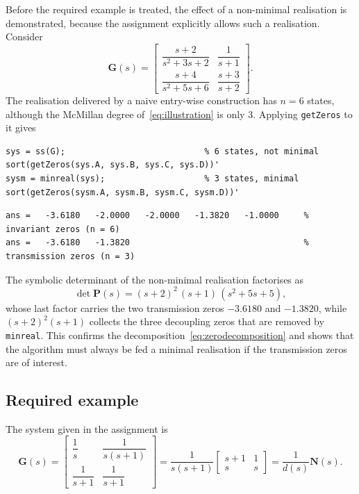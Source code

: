 Before the required example is treated, the effect of a non-minimal realisation is demonstrated,
because the assignment explicitly allows such a realisation. Consider
\begin{equation}
    \mathbf{G}(s) = \begin{bmatrix}
        \dfrac{s+2}{s^2+3s+2} & \dfrac{1}{s+1}\\[10pt]
        \dfrac{s+4}{s^2+5s+6} & \dfrac{s+3}{s+2}
    \end{bmatrix}.
    \label{eq:illustration}
\end{equation}
The realisation delivered by a naive entry-wise construction has $n=6$ states, although the
McMillan degree of~\eqref{eq:illustration} is only $3$. Applying \texttt{getZeros} to it gives
\begin{lstlisting}
sys = ss(G);                            % 6 states, not minimal
sort(getZeros(sys.A, sys.B, sys.C, sys.D))'
sysm = minreal(sys);                    % 3 states, minimal
sort(getZeros(sysm.A, sysm.B, sysm.C, sysm.D))'
\end{lstlisting}
\begin{lstlisting}[style=matlabout]
ans =   -3.6180   -2.0000   -2.0000   -1.3820   -1.0000     % invariant zeros (n = 6)
ans =   -3.6180   -1.3820                                   % transmission zeros (n = 3)
\end{lstlisting}
The symbolic determinant of the non-minimal realisation factorises as
\begin{equation}
    \det\mathbf{P}(s) = (s+2)^2\,(s+1)\,(s^2+5s+5),
    \label{eq:illustrationdet}
\end{equation}
whose last factor carries the two transmission zeros $-3.6180$ and $-1.3820$, while
$(s+2)^2(s+1)$ collects the three decoupling zeros that are removed by \texttt{minreal}. This
confirms the decomposition~\eqref{eq:zerodecomposition} and shows that the algorithm must always
be fed a minimal realisation if the transmission zeros are of interest.

\subsection{Required example}
\label{sec:example211}

The system given in the assignment is
\begin{equation}
    \mathbf{G}(s) = \begin{bmatrix}
        \dfrac{1}{s} & \dfrac{1}{s(s+1)}\\[10pt]
        \dfrac{1}{s+1} & \dfrac{1}{s+1}
    \end{bmatrix}
    = \frac{1}{s(s+1)}\begin{bmatrix} s+1 & 1\\ s & s\end{bmatrix}
    = \frac{1}{d(s)}\mathbf{N}(s).
    \label{eq:ex211}
\end{equation}

